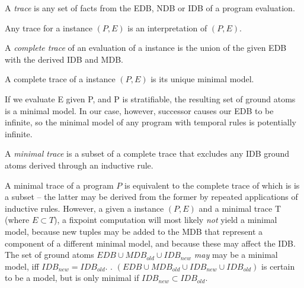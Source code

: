 
\begin{definition}
A \emph{trace} is any set of facts from the EDB, NDB or IDB of a \lang program evaluation.
\end{definition}

Any trace for a \lang instance $(P,E)$ is an interpretation of $(P,E)$.

\begin{definition}
%
A \emph{complete trace} of an evaluation of a \lang instance is the union of
the given EDB with the derived IDB and MDB.
%
\end{definition}

\begin{lemma}
%
A complete trace of a \lang instance $(P,E)$ is its unique minimal model.
%
\end{lemma}


If we evaluate E given P, and P is stratifiable, the resulting set of ground atoms is a minimal model.
In our case, however, successor causes our EDB to be infinite, so the minimal model of any \lang program 
with temporal rules is potentially infinite.  


\begin{definition}
A \emph{minimal trace} is a subset of a complete trace that excludes any IDB ground atoms derived through an inductive
rule.
\end{definition}

A minimal trace of a \lang program $P$ is equivalent to the complete trace of which is is a subset -- the latter may be derived from the former by repeated
applications of inductive rules.  However, a given a \lang instance $(P, E)$ and a minimal trace T (where $E \subset T$), a fixpoint
computation will most likely \emph{not} yield a minimal model, because new tuples may be added to the MDB that represent a component 
of a different minimal model, and because these may affect the IDB.  The set of ground atoms $EDB \cup MDB_{old} \cup IDB_{new}$
\emph{may} may be a minimal model, iff $IDB_{new} = IDB_{old}$.  .  
$(EDB \cup MDB_{old} \cup IDB_{new} \cup IDB_{old})$ is certain to be a model, but is only minimal if $IDB_{new} \subset IDB_{old}$.

